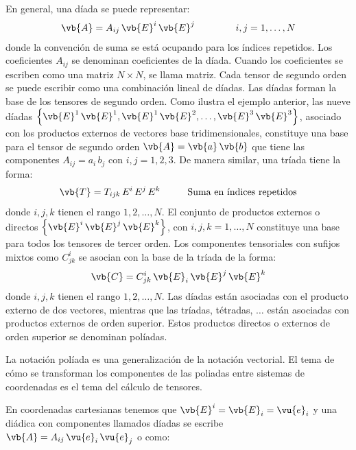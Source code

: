 En general, una díada se puede representar:
\begin{align*}
\vb{A} = A_{ij} \, \vb{E}^{i} \, \vb{E}^{j} \hspace{1.5cm} i, j = 1, \ldots, N
\end{align*}
donde la convención de suma se está ocupando para los índices repetidos. Los coeficientes $A_{ij}$ se denominan coeficientes de la díada. Cuando los coeficientes se escriben como una matriz $N \times N$, se llama matriz. Cada tensor de segundo orden se puede escribir como una combinación lineal de díadas. Las díadas forman la base de los tensores de segundo orden. Como ilustra el ejemplo anterior, las nueve díadas $\left\{ \vb{E}^{1} \, \vb{E}^{1}, \vb{E}^{1} \, \vb{E}^{2}, \ldots, \vb{E}^{3} \, \vb{E}^{3} \right\}$, asociado con los productos externos de vectores base tridimensionales, constituye una base para el tensor de segundo orden $\vb{A} = \vb{a} \, \vb{b}$ que tiene las componentes $A_{ij} = a_{i} \, b_{j}$ con $i, j = 1, 2, 3$. De manera similar, una tríada tiene la forma:
\begin{align*}
\vb{T} = T_{ijk} \, E^{i} \, E^{j} \, E^{k} \hspace{1cm} \mbox{Suma en índices repetidos}
\end{align*}
donde $i, j, k$ tienen el rango $1, 2, \ldots, N$. El conjunto de productos externos o directos $\left\{ \vb{E}^{i} \, \vb{E}^{j} \, \vb{E}^{k} \right\}$, con $i, j, k = 1, \ldots, N$ constituye una base para todos los tensores de tercer orden. Los componentes tensoriales con sufijos mixtos como $C_{jk}^{i}$ se asocian con la base de la tríada de la forma:
\begin{align*}
\vb{C} = C_{jk}^{i} \, \vb{E}_{i} \, \vb{E}^{j} \, \vb{E}^{k}
\end{align*}
donde $i, j, k$ tienen el rango $1, 2, \ldots, N$. Las díadas están asociadas con el producto externo de dos vectores, mientras que las tríadas, tétradas, $\ldots$ están asociadas con productos externos de orden superior. Estos productos directos o externos de orden superior se denominan políadas.
\par
La notación políada es una generalización de la notación vectorial. El tema de cómo se transforman los componentes de las poliadas entre sistemas de coordenadas es el tema del cálculo de tensores.
\par
En coordenadas cartesianas tenemos que $\vb{E}^{i} = \vb{E}_{i} = \vu{e}_{i}$ y una diádica con componentes llamados díadas se escribe $\vb{A} = A_{ij} \, \vu{e}_{i} \, \vu{e}_{j}$ o como:
